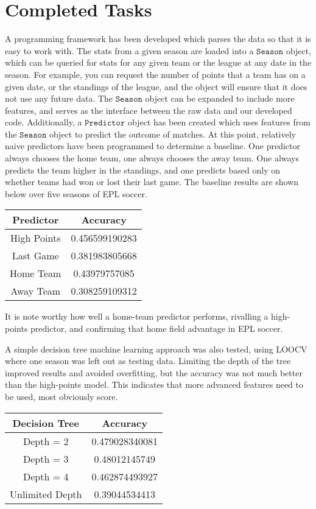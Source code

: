 \documentclass[conference]{IEEEtran}
\begin{document}
\section{Completed Tasks}
A programming framework has been developed which parses the data so that it is easy to work with. The stats from a given season are loaded into a $\mathtt{Season}$ object, which can be queried for stats for any given team or the league at any date in the season. For example, you can request the number of points that a team has on a given date, or the standings of the league, and the object will ensure that it does not use any future data. The $\mathtt{Season}$ object can be expanded to include more features, and serves as the interface between the raw data and our developed code. Additionally, a $\mathtt{Predictor}$ object has been created which uses features from the $\mathtt{Season}$ object to predict the outcome of matches. At this point, relatively naive predictors have been programmed to determine a baseline. One predictor always chooses the home team, one always chooses the away team. One always predicts the team higher in the standings, and one predicts based only on whether teams had won or lost their last game. The baseline results are shown below over five seasons of EPL soccer.

\begin{center}
  \begin{tabular}{@{} cc @{}}
    \hline
    Predictor & Accuracy \\ 
    \hline
High Points & 0.456599190283 \\ 
    Last Game & 0.381983805668\\ 
    Home Team & 0.43979757085 \\ 
    Away Team & 0.308259109312\\ 
    \hline
  \end{tabular}
\end{center}

It is note worthy how well a home-team predictor performs, rivalling a high-points predictor, and confirming that home field advantage in EPL soccer.

A simple decision tree machine learning approach was also tested, using LOOCV where one season was left out as testing data. Limiting the depth of the tree improved results and avoided overfitting, but the accuracy was not much better than the high-points model.  This indicates that more advanced features need to be used, most obviously score.

\begin{center}
  \begin{tabular}{@{} cc @{}}
    \hline
    Decision Tree & Accuracy \\ 
    \hline
Depth = 2 &0.479028340081\\ 
    Depth = 3 & 0.48012145749\\ 
   Depth = 4 & 0.462874493927 \\ 
    Unlimited Depth & 0.39044534413\\ 
    \hline
  \end{tabular}
\end{center}
\end{document}
